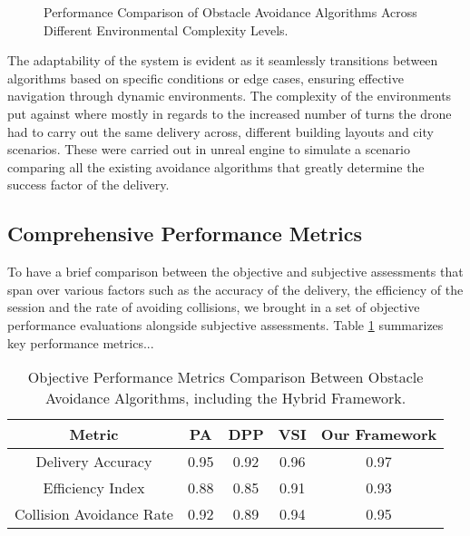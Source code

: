 \documentclass[preprint,12pt]{elsarticle}
\begin{document}
\begin{figure}[htbp]
  \centering
  \caption{Performance Comparison of Obstacle Avoidance Algorithms Across Different Environmental Complexity Levels.}
  \label{fig:algorithm-comparison}
\end{figure}

The adaptability of the system is evident as it seamlessly transitions between algorithms based on specific conditions or edge cases, ensuring effective navigation through dynamic environments. The complexity of the environments put against where mostly in regards to the increased number of turns the drone had to carry out the same delivery across, different building layouts and city scenarios. These were carried out in unreal engine to simulate a scenario comparing all the existing avoidance algorithms that greatly determine the success factor of the delivery.

\subsection{Comprehensive Performance Metrics}
To have a brief comparison between the objective and subjective assessments that span over various factors such as the accuracy of the delivery, the efficiency of the session and the rate of avoiding collisions, we brought in a set of objective performance evaluations alongside subjective assessments. Table \ref{tab:performance-metrics} summarizes key performance metrics...

\begin{table}[htbp]
  \centering
  \begin{tabular}{|c|c|c|c|c|}
    \hline
    Metric & PA & DPP & VSI & Our Framework \\
    \hline
    Delivery Accuracy & 0.95 & 0.92 & 0.96 & 0.97 \\
    Efficiency Index & 0.88 & 0.85 & 0.91 & 0.93 \\
    Collision Avoidance Rate & 0.92 & 0.89 & 0.94 & 0.95 \\
    \hline
  \end{tabular}
  \caption{Objective Performance Metrics Comparison Between Obstacle Avoidance Algorithms, including the Hybrid Framework.}
  \label{tab:performance-metrics}
\end{table}
\end{document}
